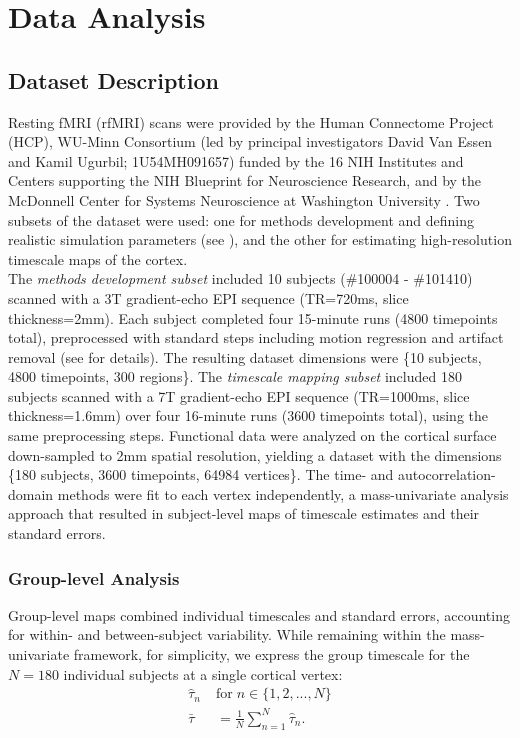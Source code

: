\documentclass[latex/main.tex]{subfiles}
\begin{document}
\section{Data Analysis}

\subsection{Dataset Description}\label{sec:dataset-description}

Resting fMRI (rfMRI) scans were provided by the Human Connectome Project (HCP), WU-Minn Consortium (led by principal investigators David Van Essen and Kamil Ugurbil; 1U54MH091657) funded by the 16 NIH Institutes and Centers supporting the NIH Blueprint for Neuroscience Research, and by the McDonnell Center for Systems Neuroscience at Washington University \citep{van_essen_wu-minn_2013}. Two subsets of the dataset were used: one for methods development and defining realistic simulation parameters (see ), and the other for estimating high-resolution timescale maps of the cortex.\\

The \textit{methods development subset} included 10 subjects  (\#100004 - \#101410) scanned with a 3T gradient-echo EPI sequence (TR=720ms, slice thickness=2mm). Each subject completed four 15-minute runs (4800 timepoints total), preprocessed with standard steps including motion regression and artifact removal (see \citet{glasser_minimal_2013} for details). The resulting dataset dimensions were \{10 subjects, 4800 timepoints, 300 regions\}. The \textit{timescale mapping subset} included 180 subjects scanned with a 7T gradient-echo EPI sequence (TR=1000ms, slice thickness=1.6mm) over four 16-minute runs (3600 timepoints total), using the same preprocessing steps. Functional data were analyzed on the cortical surface down-sampled to 2mm spatial resolution, yielding a dataset with the dimensions \{180 subjects, 3600 timepoints, 64984 vertices\}. The time- and autocorrelation-domain methods were fit to each vertex independently, a mass-univariate analysis approach that resulted in subject-level maps of timescale estimates and their standard errors.\\

\subsubsection{Group-level Analysis}\label{sec:group-level-analysis}
Group-level maps combined individual timescales and standard errors, accounting for within- and between-subject variability. While remaining within the mass-univariate framework, for simplicity, we express the group timescale for the $N=180$ individual subjects at a single cortical vertex:
\begin{align}
    \hat\tau_n \; &\text{for} \; n\in\{1, 2, ..., N\}\\
    \bar\tau &= \frac{1}{N} \sum_{n=1}^N \hat\tau_n.
\end{align}
\end{document}
